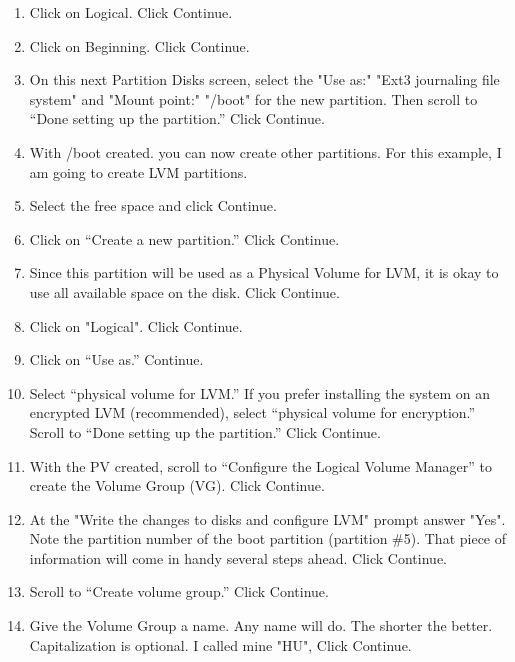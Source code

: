 \documentclass[12pt,notitlepage,onecolumn,oneside,openany]{memoir}
\begin{document}
\begin{enumerate}
\item \textsf{Click on Logical. Click Continue.}

\item \textsf{Click on Beginning. Click Continue.} 

\item \textsf{On this next Partition Disks screen, select the "Use as:" "Ext3 journaling file system" and "Mount point:" "/boot" for the new partition. Then scroll to “Done setting up the partition.” Click Continue.}

\item \textsf{With /boot created. you can now create other partitions. For this example, I am going to create LVM partitions.}
 
\item \textsf{Select the free space and click Continue.}
 
\item \textsf{Click on “Create a new partition.” Click Continue.} 

\item \textsf{Since this partition will be used as a Physical Volume for LVM, it is okay to use all available space on the disk. Click Continue.}
 
\item \textsf{Click on "Logical". Click Continue.}
 
\item \textsf{Click on “Use as.” Continue.} 

\item \textsf{Select “physical volume for LVM.” If you prefer installing the system on an encrypted LVM (recommended), select “physical volume for encryption.” Scroll to “Done setting up the partition.” Click Continue.} 

\item \textsf{With the PV created, scroll to “Configure the Logical Volume Manager” to create the Volume Group (VG). Click Continue.}
 
\item \textsf{At the "Write the changes to disks and configure LVM" prompt answer "Yes". Note the partition number of the boot partition (partition \#5). That piece of information will come in handy several steps ahead. Click Continue.} 

\item \textsf{Scroll to “Create volume group.” Click Continue.} 

\item \textsf{Give the Volume Group a name. Any name will do. The shorter the better. Capitalization is optional.  I called mine "HU", Click Continue.}
 

\end{enumerate}
\end{document}
